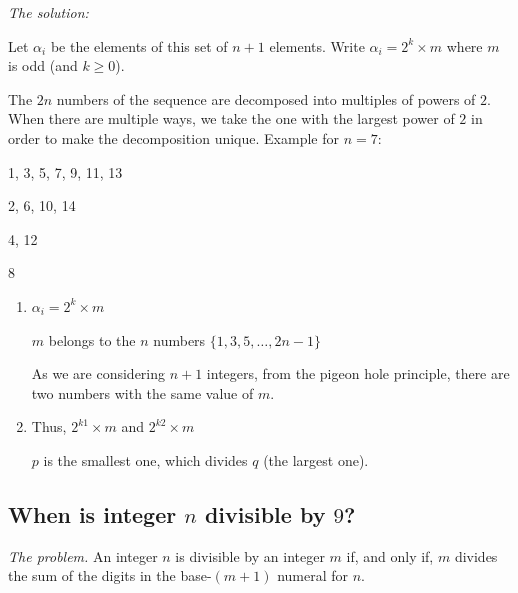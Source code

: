 \noindent \textit{The solution:}




Let $\alpha_i$ be the elements of this set of $n+1$ elements.
Write $\alpha_i = 2^k \times m$ where $m$ is odd (and $k \geq 0$).

The $2n$ numbers of the sequence are decomposed into multiples of powers of $2$.
When there are multiple ways, we take the one with the largest power of $2$ in order to make the decomposition unique.
Example for $n=7$:

1, 3, 5, 7, 9, 11, 13

2, 6, 10, 14

4, 12

8
\medskip


\begin{enumerate}
\item
 $\alpha_i = 2^k \times m$ 
 
$m$ belongs to the $n$ numbers $\{1,3,5, \ldots, 2n-1 \}$

As we are considering $n+1$ integers, from the pigeon hole principle, there are two numbers with the same value of $m$. 
\item 
Thus, $2^{k1} \times m$ and $2^{k2} \times m$

$p$ is the smallest one, which divides $q$ (the largest one).
\end{enumerate}


\subsection{When is integer $n$ divisible by $9$?}
\label{sec:divisible-by-9}

%
%
\noindent \textit{The problem.}
An integer $n$ is divisible by an integer $m$ if, and only if, $m$
divides the sum of the digits in the base-$(m+1)$ numeral for $n$.
%
\medskip

